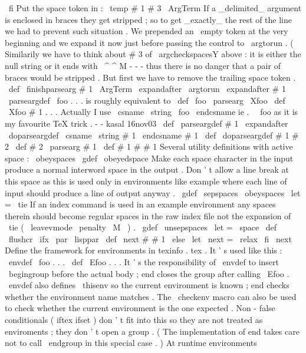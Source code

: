{{\
fi
%
Put
the
space
token
in
:
\
temp
#
1
#
3
\
ArgTerm
}
%
If
a
_delimited_
argument
is
enclosed
in
braces
they
get
stripped
;
so
%
to
get
_exactly_
the
rest
of
the
line
we
had
to
prevent
such
situation
.
%
We
prepended
an
\
empty
token
at
the
very
beginning
and
we
expand
it
now
%
just
before
passing
the
control
to
\
argtorun
.
%
(
Similarily
we
have
to
think
about
#
3
of
\
argcheckspacesY
above
:
it
is
%
either
the
null
string
or
it
ends
with
\
^
^
M
-
-
-
thus
there
is
no
danger
%
that
a
pair
of
braces
would
be
stripped
.
%
%
But
first
we
have
to
remove
the
trailing
space
token
.
%
\
def
\
finishparsearg
#
1
\
ArgTerm
{
\
expandafter
\
argtorun
\
expandafter
{
#
1
}
}
%
\
parseargdef
\
foo
{
.
.
.
}
%
is
roughly
equivalent
to
%
\
def
\
foo
{
\
parsearg
\
Xfoo
}
%
\
def
\
Xfoo
#
1
{
.
.
.
}
%
%
Actually
I
use
\
csname
\
string
\
foo
\
endcsname
ie
.
\
\
foo
as
it
is
my
%
favourite
TeX
trick
.
-
-
kasal
16nov03
\
def
\
parseargdef
#
1
{
%
\
expandafter
\
doparseargdef
\
csname
\
string
#
1
\
endcsname
#
1
%
}
\
def
\
doparseargdef
#
1
#
2
{
%
\
def
#
2
{
\
parsearg
#
1
}
%
\
def
#
1
#
#
1
%
}
%
Several
utility
definitions
with
active
space
:
{
\
obeyspaces
\
gdef
\
obeyedspace
{
}
%
Make
each
space
character
in
the
input
produce
a
normal
interword
%
space
in
the
output
.
Don
'
t
allow
a
line
break
at
this
space
as
this
%
is
used
only
in
environments
like
example
where
each
line
of
input
%
should
produce
a
line
of
output
anyway
.
%
\
gdef
\
sepspaces
{
\
obeyspaces
\
let
=
\
tie
}
%
If
an
index
command
is
used
in
an
example
environment
any
spaces
%
therein
should
become
regular
spaces
in
the
raw
index
file
not
the
%
expansion
of
\
tie
(
\
leavevmode
\
penalty
\
M
\
)
.
\
gdef
\
unsepspaces
{
\
let
=
\
space
}
}
\
def
\
flushcr
{
\
ifx
\
par
\
lisppar
\
def
\
next
#
#
1
{
}
\
else
\
let
\
next
=
\
relax
\
fi
\
next
}
%
Define
the
framework
for
environments
in
texinfo
.
tex
.
It
'
s
used
like
this
:
%
%
\
envdef
\
foo
{
.
.
.
}
%
\
def
\
Efoo
{
.
.
.
}
%
%
It
'
s
the
responsibility
of
\
envdef
to
insert
\
begingroup
before
the
%
actual
body
;
end
closes
the
group
after
calling
\
Efoo
.
\
envdef
also
%
defines
\
thisenv
so
the
current
environment
is
known
;
end
checks
%
whether
the
environment
name
matches
.
The
\
checkenv
macro
can
also
be
%
used
to
check
whether
the
current
environment
is
the
one
expected
.
%
%
Non
-
false
conditionals
(
iftex
ifset
)
don
'
t
fit
into
this
so
they
%
are
not
treated
as
enviroments
;
they
don
'
t
open
a
group
.
(
The
%
implementation
of
end
takes
care
not
to
call
\
endgroup
in
this
%
special
case
.
)
%
At
runtime
environments
}
